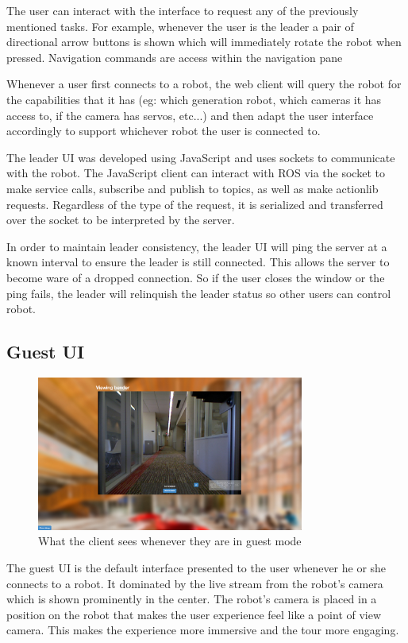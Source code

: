\documentclass[
  oneside,
  11pt, a4paper,
  footinclude=true,
  headinclude=true,
  cleardoublepage=empty
]{article}
\begin{document}
The user can interact with the interface to request any of the previously
mentioned tasks. For example, whenever the user is the leader a pair of
directional arrow buttons is shown which will immediately rotate the robot when
pressed. Navigation commands are access within the navigation pane

Whenever a user first connects to a robot, the web client will query the robot
for the capabilities that it has (eg: which generation robot, which cameras it
has access to, if the camera has servos, etc...) and then adapt the user
interface accordingly to support whichever robot the user is connected to.

The leader UI was developed using JavaScript and uses sockets to
communicate with the robot. The JavaScript client can interact with ROS via the
socket to make service calls, subscribe and publish to topics, as well as make
actionlib requests. Regardless of the type of the request, it is serialized and
transferred over the socket to be interpreted by the server.

In order to maintain leader consistency, the leader UI will ping the server at
a known interval to ensure the leader is still connected. This allows the
server to become ware of a dropped connection. So if the user closes the window
or the ping fails, the leader will relinquish the leader status so other users
can control robot.


\subsection{Guest UI}

\begin{figure}
\centering
\includegraphics[height=2in]{guestUI}
\caption{What the client sees whenever they are in guest mode}
\end{figure}

The guest UI is the default interface presented to the user whenever he or she
connects to a robot. It dominated by the live stream from the robot's camera
which is shown prominently in the center. The robot's camera is placed in a
position on the robot that makes the user experience feel like a point of view
camera. This makes the experience more immersive and the tour more engaging.
\end{document}
